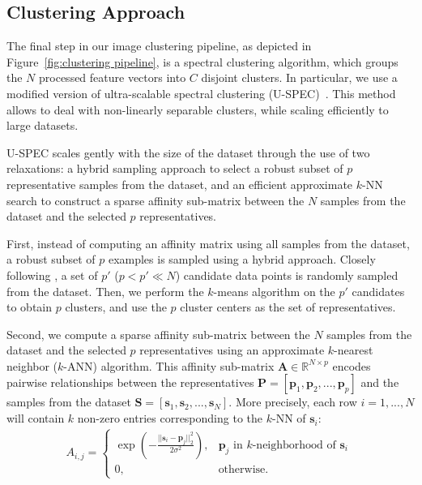 \documentclass[11pt]{article}
\theoremstyle{definition}
\newcommand{\Candidates}{p'}
\newcommand{\Representatives}{p}
\newcommand{\Sample}[1]{\mathbf{s}_{#1}}
\newcommand{\RepresentativesVector}{\mathbf{P}}
\newcommand{\DatasetSamples}{\mathbf{S}}
\newcommand{\AffinityMatrix}{\mathbf{A}}
\newcommand{\AffinityMatrixEntry}[2]{A_{{#1},{#2}}}
\newcommand{\NumClusters}{C}
\newcommand{\Figure}[1]{Figure~\ref{#1}}
\begin{document}
\subsection{Clustering Approach}\label{sec:Clustering Approach}

The final step in our image clustering pipeline, as depicted in \Figure{fig:clustering pipeline}, is a spectral clustering algorithm, which groups the $N$ processed feature vectors into $\NumClusters$ disjoint clusters.
In particular, we use a modified version of ultra-scalable spectral clustering (U-SPEC)~\cite{Huang_UltraScalableSpectralClustering_2019}. This method
allows to deal with non-linearly separable clusters, while scaling efficiently to large datasets.

U-SPEC scales gently with the size of the dataset through the use of two relaxations: a hybrid sampling approach to select a robust subset of $\Representatives$ representative samples from the dataset, and an efficient approximate $k$-NN search to construct a sparse affinity sub-matrix between the $N$ samples from the dataset and the selected $\Representatives$ representatives.

First, instead of computing an affinity matrix using all samples from the dataset, a robust subset of $\Representatives$ examples is sampled using a hybrid approach. Closely following \cite{Huang_UltraScalableSpectralClustering_2019}, a set of $\Candidates$ ($\Representatives < \Candidates \ll N$) candidate data points is randomly sampled from the dataset. Then, we perform the $k$-means algorithm on the $\Candidates$ candidates to obtain $\Representatives$ clusters, and use the $\Representatives$ cluster centers as the set of representatives.

Second, we compute a sparse affinity sub-matrix  between the $N$ samples from the dataset and the selected $\Representatives$ representatives using an approximate $k$-nearest neighbor ($k$-ANN) algorithm. This affinity sub-matrix $\AffinityMatrix \in \mathbb{R}^{N \times \Representatives}$ encodes pairwise relationships between the representatives
$\RepresentativesVector = [\mathbf{\Representatives}_1,  \mathbf{\Representatives}_2, ...,  \mathbf{\Representatives}_{\Representatives}]$ and the samples from the dataset 
$\DatasetSamples = [\Sample{1}, \Sample{2}, ..., \Sample{N}]$.
More precisely, each row $i=1,...,N$ will contain $k$ non-zero entries corresponding to the $k$-NN of $\Sample{i}$:
\begin{align}
& \AffinityMatrixEntry{i}{j} = 
\begin{cases}	
\exp \left(-\frac{||\mathbf{s}_i - \mathbf{p}_j||^2_2}{2\sigma^2} \right), &\mathbf{\Representatives}_j \text{ in } k\text{-neighborhood of } \Sample{i} \quad \\
0 , & \text{otherwise.}
\end{cases}
\end{align}
\end{document}
